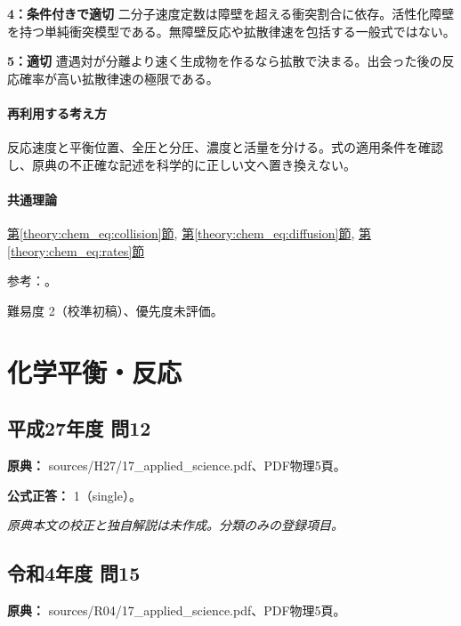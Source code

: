 \noindent\textbf{4：条件付きで適切} 二分子速度定数は障壁を超える衝突割合に依存。活性化障壁を持つ単純衝突模型である。無障壁反応や拡散律速を包括する一般式ではない。\par

\noindent\textbf{5：適切} 遭遇対が分離より速く生成物を作るなら拡散で決まる。出会った後の反応確率が高い拡散律速の極限である。\par

\paragraph{再利用する考え方} 反応速度と平衡位置、全圧と分圧、濃度と活量を分ける。式の適用条件を確認し、原典の不正確な記述を科学的に正しい文へ置き換えない。

\paragraph{共通理論} \hyperref[theory:chem_eq:collision]{第\ref*{theory:chem_eq:collision}節}, \hyperref[theory:chem_eq:diffusion]{第\ref*{theory:chem_eq:diffusion}節}, \hyperref[theory:chem_eq:rates]{第\ref*{theory:chem_eq:rates}節}

\par 参考：\cite{iupac_greenbook2012}。

\par 難易度 2（校準初稿）、優先度未評価。

\section{化学平衡・反応}

\subsection{平成27年度 問12}
\label{q:h27-reg-applied-12}

\noindent\textbf{原典：} sources/H27/17\_applied\_science.pdf、PDF物理5頁。

\textbf{公式正答：} 1（single）。

\par\textit{原典本文の校正と独自解説は未作成。分類のみの登録項目。}

\subsection{令和4年度 問15}
\label{q:r04-reg-applied-15}

\noindent\textbf{原典：} sources/R04/17\_applied\_science.pdf、PDF物理5頁。

